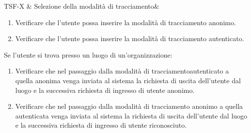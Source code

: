 

TSF-X & Selezione della modalità di tracciamento& \begin{enumerate}
    \item Verificare che l'utente possa inserire la modalità di tracciamento anonimo.
    \item Verificare che l'utente possa inserire la modalità di tracciamento autenticato.
\end{enumerate}
Se l'utente si trova presso un luogo di un'organizzazione:
\begin{enumerate}
    \item Verificare che nel passaggio dalla modalità di tracciamentoautenticato a quella anonima venga inviata al sistema la richiesta di uscita dell'utente dal luogo e la successiva richiesta di ingresso di utente anonimo.
    \item Verificare che nel passaggio dalla modalità di tracciamento anonimo a quella autenticata venga inviata al sistema la richiesta di uscita dell'utente dal luogo e la successiva richiesta di ingresso di utente riconosciuto.
\end{enumerate} \\


